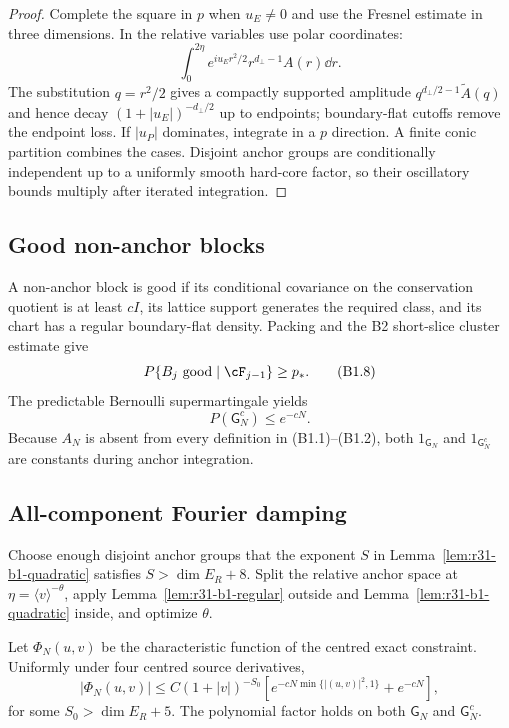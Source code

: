 \begin{proof}
Complete the square in $p$ when $u_E\ne0$ and use the Fresnel estimate in
three dimensions.  In the relative variables use polar coordinates:
\[
 \int_0^{2\eta}e^{iu_Er^2/2}r^{d_\perp-1}A(r)\dd r.
\]
The substitution $q=r^2/2$ gives a compactly supported amplitude
$q^{d_\perp/2-1}\widetilde A(q)$ and hence decay
$(1+|u_E|)^{-d_\perp/2}$ up to endpoints; boundary-flat cutoffs remove the
endpoint loss.  If $|u_P|$ dominates, integrate in a $p$ direction.  A finite
conic partition combines the cases.  Disjoint anchor groups are conditionally
independent up to a uniformly smooth hard-core factor, so their oscillatory
bounds multiply after iterated integration.
\end{proof}

\subsection{Good non-anchor blocks}

A non-anchor block is good if its conditional covariance on the conservation
quotient is at least $cI$, its lattice support generates the required class,
and its chart has a regular boundary-flat density.  Packing and the B2
short-slice cluster estimate give
\[
 P\{B_j\text{ good}\mid\cF_{j-1}\}\ge p_*.              \tag{B1.8}
\]
The predictable Bernoulli supermartingale yields
\[
 P(\mathsf G_N^c)\le e^{-cN}.                             \tag{B1.9}
\]
Because $A_N$ is absent from every definition in (B1.1)--(B1.2), both
$1_{\mathsf G_N}$ and $1_{\mathsf G_N^c}$ are constants during anchor
integration.

\subsection{All-component Fourier damping}

Choose enough disjoint anchor groups that the exponent $S$ in
Lemma~\ref{lem:r31-b1-quadratic} satisfies
$S>\dim E_R+8$.  Split the relative anchor space at
$\eta=\langle v\rangle^{-\theta}$, apply
Lemma~\ref{lem:r31-b1-regular} outside and
Lemma~\ref{lem:r31-b1-quadratic} inside, and optimize $\theta$.

\begin{theorem}
\label{thm:r31-b1-damping}
Let $\Phi_N(u,v)$ be the characteristic function of the centred exact
constraint.  Uniformly under four centred source derivatives,
\[
 |\Phi_N(u,v)|
 \le C(1+|v|)^{-S_0}
 \left[e^{-cN\min\{|(u,v)|^2,1\}}+e^{-cN}\right],         \tag{B1.10}
\]
for some $S_0>\dim E_R+5$.  The polynomial factor holds on both
$\mathsf G_N$ and $\mathsf G_N^c$.
\end{theorem}

